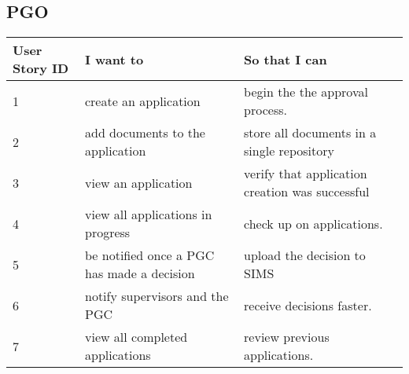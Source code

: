 \documentclass[11pt]{article}
\begin{document}
\subsection{PGO}
\begin{table}[H]
	\hskip-4.0cm\begin{tabular}{@{}|l|l|l|@{}}

  \toprule                                                                            
		\textbf{User Story ID}  & \textbf{I want to}                                & \textbf{So that I can}                                      \\ \midrule

		  1                    & create an application                             & begin the the approval process.               \\ \midrule
		  2                    & add documents to the application                  & store all documents in a single repository               \\ \midrule
		  3                    & view an application				                      & verify that application creation was successful                    \\ \midrule
		  4                    & view all applications in progress                  & check up on applications.                                   \\ \midrule
		  5                    & be notified once a PGC has made a decision        & upload the decision to SIMS      \\ \midrule
		  6                   & notify supervisors and the PGC      & receive decisions faster.                             \\ \midrule
		  7                   & view all completed applications                   & review previous applications. \\ \midrule

	\end{tabular}
\end{table}
\end{document}
